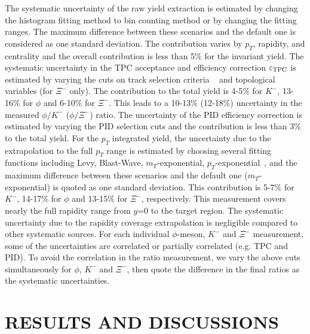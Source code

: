 \documentclass[aps,tightenlines,superscriptaddress,twocolumn]{revtex4-1}
\begin{document}
The systematic uncertainty of the raw yield extraction is estimated by changing the histogram fitting method to bin counting method or by changing the fitting ranges. The maximum difference between these scenarios and the default one is considered as one standard deviation. The contribution varies by $p_T$, rapidity, and centrality and the overall contribution is less than 5\% for the invariant yield. The systematic uncertainty in the TPC acceptance and efficiency correction $\varepsilon_{\rm TPC}$ is estimated by varying the cuts on track selection criteria ~\cite{Adamczyk:2017iwn} and topological variables (for $\Xi^-$ only). The contribution to the total yield is 4-5\% for $K^-$, 13-16\% for $\phi$ and 6-10\% for $\Xi^-$. This leads to a 10-13\% (12-18\%) uncertainty in the measured $\phi/K^-$ ($\phi/\Xi^-$) ratio. The uncertainty of the PID efficiency correction is estimated by varying the PID selection cuts and the contribution is less than 3\% to the total yield.
For the $p_T$ integrated yield, the uncertainty due to the extrapolation to the full $p_T$ range is estimated by choosing several fitting functions including Levy, Blast-Wave, $m_T$-exponential, $p_T$-exponential~\cite{STAR_particleYield:2009}, and the maximum difference between these scenarios and the default one ($m_T$-exponential) is quoted as one standard deviation. This contribution is 5-7\% for $K^-$, 14-17\% for $\phi$ and 13-15\% for $\Xi^-$, respectively. 
This measurement covers nearly the full rapidity range from $y$=0 to the target region. The systematic uncertainty due to the rapidity coverage extrapolation is negligible compared to other systematic sources.
For each individual $\phi$-meson, $K^-$ and $\Xi^-$ measurement, some of the uncertainties are correlated or partially correlated (e.g. TPC and PID). To avoid the correlation in the ratio measurement, we vary the above cuts simultaneously for $\phi$, $K^-$ and $\Xi^-$, then quote the difference in the final ratios as the systematic uncertainties.


\section{RESULTS AND DISCUSSIONS}
\label{results}
\end{document}
